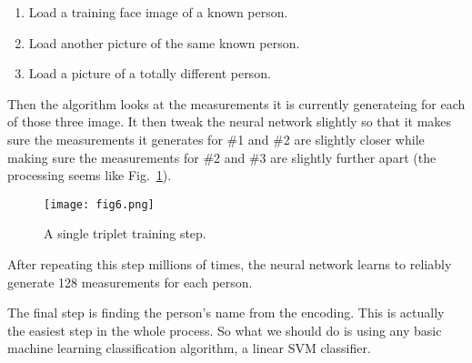 \documentclass[10pt,twocolumn,letterpaper]{article}
\begin{document}
	\begin{enumerate}
		\item Load a training face image of a known person.
		\item Load another picture of the same known person.
		\item Load a picture of a totally different person.
	\end{enumerate}
	\par
	Then the algorithm looks at the measurements it is currently generateing for each of those three image. It then tweak the neural network slightly so that it makes sure the measurements it generates for \#1 and \#2 are slightly closer while making sure the measurements for \#2 and \#3 are slightly further apart (the processing seems like Fig.~\ref{fig6}).
	\begin{figure}[h]
		\centering
		\texttt{[image: fig6.png]}
		\caption{A single triplet training step.}\label{fig6}
	\end{figure}
	\par
	After repeating this step millions of times, the neural network learns to reliably generate 128 measurements for each person.
	\par
	The final step is finding the person's name from the encoding. This is actually the easiest step in the whole process. So what we should do is using any basic machine learning classification algorithm, \eg a linear SVM classifier.
	

		



	{\small
		
		
	}
\end{document}
